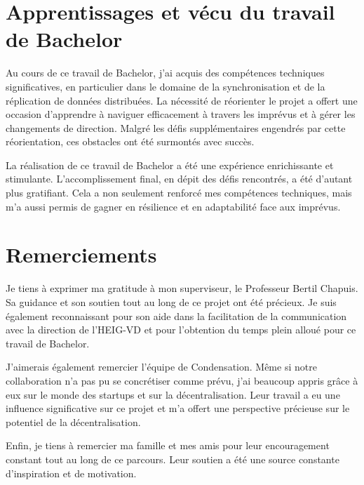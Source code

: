 \section{Apprentissages et vécu du travail de Bachelor}

Au cours de ce travail de Bachelor, j'ai acquis des compétences techniques significatives, en particulier dans le domaine de la synchronisation et de la réplication de données distribuées. La nécessité de réorienter le projet a offert une occasion d'apprendre à naviguer efficacement à travers les imprévus et à gérer les changements de direction. Malgré les défis supplémentaires engendrés par cette réorientation, ces obstacles ont été surmontés avec succès.

La réalisation de ce travail de Bachelor a été une expérience enrichissante et stimulante. L'accomplissement final, en dépit des défis rencontrés, a été d'autant plus gratifiant. Cela a non seulement renforcé mes compétences techniques, mais m'a aussi permis de gagner en résilience et en adaptabilité face aux imprévus.

\section{Remerciements}

Je tiens à exprimer ma gratitude à mon superviseur, le Professeur Bertil Chapuis. Sa guidance et son soutien tout au long de ce projet ont été précieux. Je suis également reconnaissant pour son aide dans la facilitation de la communication avec la direction de l'HEIG-VD et pour l'obtention du temps plein alloué pour ce travail de Bachelor.

J'aimerais également remercier l'équipe de Condensation. Même si notre collaboration n'a pas pu se concrétiser comme prévu, j'ai beaucoup appris grâce à eux sur le monde des startups et sur la décentralisation. Leur travail a eu une influence significative sur ce projet et m'a offert une perspective précieuse sur le potentiel de la décentralisation.

Enfin, je tiens à remercier ma famille et mes amis pour leur encouragement constant tout au long de ce parcours. Leur soutien a été une source constante d'inspiration et de motivation.

\hspace{8cm}\makeatletter\@author\makeatother\par
\hspace{8cm}\begin{minipage}{5cm}
\end{minipage}
\printsignature